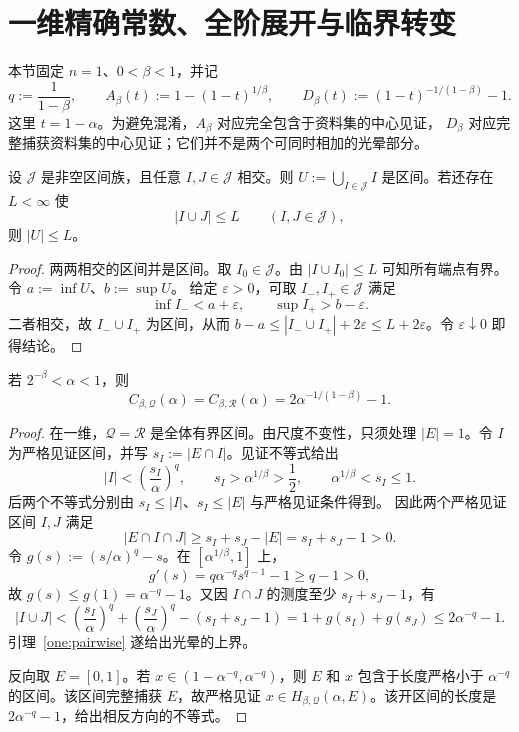 \section{一维精确常数、全阶展开与临界转变}\label{sec:one-dimensional}

本节固定 $n=1$、$0<\beta<1$，并记
\[
 q:=\frac{1}{1-\beta},\qquad
 A_\beta(t):=1-(1-t)^{1/\beta},\qquad
 D_\beta(t):=(1-t)^{-1/(1-\beta)}-1.
\]
这里 $t=1-\alpha$。为避免混淆，$A_\beta$ 对应完全包含于资料集的中心见证，
$D_\beta$ 对应完整捕获资料集的中心见证；它们并不是两个可同时相加的光晕部分。

\begin{lemma}[两两相交区间族]\label{one:pairwise}
设 $\mathscr J$ 是非空区间族，且任意 $I,J\in\mathscr J$ 相交。则
$U:=\bigcup_{I\in\mathscr J}I$ 是区间。若还存在 $L<\infty$ 使
\[
 |I\cup J|\le L\qquad(I,J\in\mathscr J),
\]
则 $|U|\le L$。
\end{lemma}

\begin{proof}
两两相交的区间并是区间。取 $I_0\in\mathscr J$。由
$|I\cup I_0|\le L$ 可知所有端点有界。令 $a:=\inf U$、$b:=\sup U$。
给定 $\varepsilon>0$，可取 $I_-,I_+\in\mathscr J$ 满足
\[
 \inf I_-<a+\varepsilon,\qquad \sup I_+>b-\varepsilon.
\]
二者相交，故 $I_-\cup I_+$ 为区间，从而
$b-a\le |I_-\cup I_+|+2\varepsilon\le L+2\varepsilon$。令
$\varepsilon\downarrow0$ 即得结论。
\end{proof}

\begin{theorem}[一维非中心精确常数]\label{one:uncentered}
若 $2^{-\beta}<\alpha<1$，则
\[
 C_{\beta,\mathcal Q}(\alpha)
 =C_{\beta,\mathcal R}(\alpha)
 =2\alpha^{-1/(1-\beta)}-1.
\]
\end{theorem}

\begin{proof}
在一维，$\mathcal Q=\mathcal R$ 是全体有界区间。由尺度不变性，只须处理
$|E|=1$。令 $I$ 为严格见证区间，并写 $s_I:=|E\cap I|$。见证不等式给出
\[
 |I|<\left(\frac{s_I}{\alpha}\right)^q,
 \qquad s_I>\alpha^{1/\beta}>\frac12,
 \qquad \alpha^{1/\beta}<s_I\le1.
\]
后两个不等式分别由 $s_I\le |I|$、$s_I\le |E|$ 与严格见证条件得到。
因此两个严格见证区间 $I,J$ 满足
\[
 |E\cap I\cap J|\ge s_I+s_J-|E|=s_I+s_J-1>0.
\]
令 $g(s):=(s/\alpha)^q-s$。在 $[\alpha^{1/\beta},1]$ 上，
\[
 g'(s)=q\alpha^{-q}s^{q-1}-1\ge q-1>0,
\]
故 $g(s)\le g(1)=\alpha^{-q}-1$。又因 $I\cap J$ 的测度至少
$s_I+s_J-1$，有
\[
 |I\cup J|
 <\left(\frac{s_I}{\alpha}\right)^q+
   \left(\frac{s_J}{\alpha}\right)^q-(s_I+s_J-1)
 =1+g(s_I)+g(s_J)
 \le2\alpha^{-q}-1.
\]
引理~\ref{one:pairwise} 遂给出光晕的上界。

反向取 $E=[0,1]$。若 $x\in(1-\alpha^{-q},\alpha^{-q})$，则 $E$ 和 $x$
包含于长度严格小于 $\alpha^{-q}$ 的区间。该区间完整捕获 $E$，故严格见证
$x\in H_{\beta,\mathcal Q}(\alpha,E)$。该开区间的长度是
$2\alpha^{-q}-1$，给出相反方向的不等式。
\end{proof}

